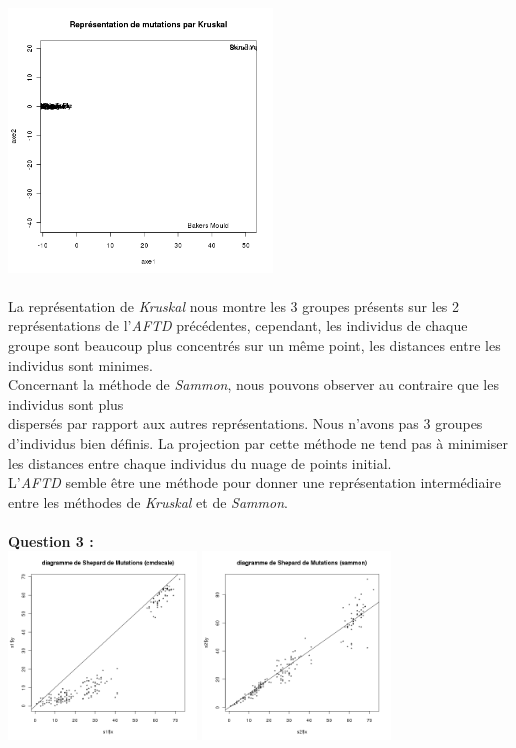 \documentclass[a4paper, 10pt]{article}
\begin{document}
\includegraphics[height = 7cm, width = 7cm]{plots/plot_mutations_kruskal.png}\\ \\
La représentation de \textit{Kruskal} nous montre les 3 groupes présents sur les 2 représentations de l'\textit{AFTD} précédentes,
cependant, les individus de chaque groupe sont beaucoup plus concentrés sur un même point, les distances entre les individus sont minimes.\\
Concernant la méthode de \textit{Sammon}, nous pouvons observer au contraire que les individus sont plus\\dispersés par rapport aux autres
représentations. Nous n'avons pas 3 groupes d'individus bien définis. La projection par cette méthode ne tend pas à minimiser les distances
entre chaque individus du nuage de points initial.\\
L'\textit{AFTD} semble être une méthode pour donner une représentation intermédiaire entre les méthodes de \textit{Kruskal} et de
\textit{Sammon}.\\ \\
\textbf{Question 3 :}\\
\includegraphics[height = 5cm, width = 5cm]{plots/plot_mutations_shepard_cmdscale.png}
\includegraphics[height = 5cm, width = 5cm]{plots/plot_mutations_shepard_sammon.png}
\end{document}
